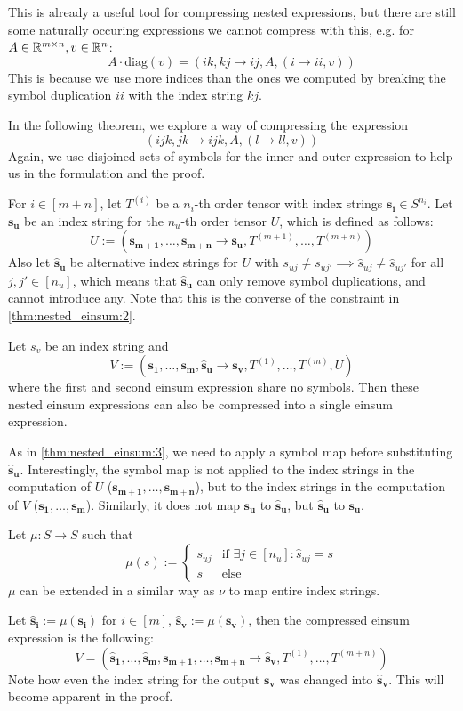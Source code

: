 This is already a useful tool for compressing nested expressions, but there are still some naturally occuring expressions we cannot compress with this,
e.g. for $A \in \mathbb{R}^{m \times n}, v \in \mathbb{R}^{n}$:
$$A \cdot \text{diag}(v) = (ik, kj \rightarrow ij, A, (i \rightarrow ii, v))$$
This is because we use more indices than the ones we computed by breaking the symbol duplication $ii$ with the index string $kj$.

In the following theorem, we explore a way of compressing the expression
$$(ijk, jk \rightarrow ijk, A, (l \rightarrow ll, v))$$
Again, we use disjoined sets of symbols for the inner and outer expression to help us in the formulation and the proof.

\begin{theorem}
    \label{thm:nested_einsum:3}

    For $i \in [m + n]$, let $T^{(i)}$ be a $n_i$-th order tensor with index strings $\bm{s_i} \in S^{n_i}$.
    Let $\bm{s_u}$ be an index string for the $n_u$-th order tensor $U$, which is defined as follows:
    $$U := (\bm{s_{m + 1}},\dots,\bm{s_{m + n}} \rightarrow \bm{s_u}, T^{(m + 1)},\dots,T^{(m + n)})$$
    Also let $\bm{\hat{s}_u}$ be alternative index strings for $U$ with $s_{uj} \neq s_{uj'} \implies \hat{s}_{uj} \neq \hat{s}_{uj'}$ for all $j, j' \in [n_u]$,
    which means that $\bm{\hat{s}_u}$ can only remove symbol duplications, and cannot introduce any.
    Note that this is the converse of the constraint in \autoref{thm:nested_einsum:2}.

    Let $s_v$ be an index string and
    $$V := (\bm{s_1},\dots,\bm{s_m}, \bm{\hat{s}_u} \rightarrow \bm{s_v}, T^{(1)},\dots,T^{(m)}, U)$$
    where the first and second einsum expression share no symbols.
    Then these nested einsum expressions can also be compressed into a single einsum expression.

    As in \autoref{thm:nested_einsum:3}, we need to apply a symbol map before substituting $\bm{\hat{s}_u}$.
    Interestingly, the symbol map is not applied to the index strings in the computation of $U$ ($\bm{s_{m + 1}},\dots,\bm{s_{m + n}}$),
    but to the index strings in the computation of $V$ ($\bm{s_1},\dots,\bm{s_m}$).
    Similarly, it does not map $\bm{s_u}$ to $\bm{\hat{s}_u}$, but $\bm{\hat{s}_u}$ to $\bm{s_u}$.

    Let $\mu: S \rightarrow S$ such that
    $$\mu(s) := \begin{cases}
            s_{uj} & \text{if }\exists j \in [n_u]: \hat{s}_{uj} = s \\
            s      & \text{else}
        \end{cases}$$
    $\mu$ can be extended in a similar way as $\nu$ to map entire index strings.

    Let $\bm{\hat{s}_i} := \mu(\bm{s_i})$ for $i \in [m]$, $\bm{\hat{s}_v} := \mu(\bm{s_v})$, then the compressed einsum expression is the following:
    $$V = (\bm{\hat{s}_1},\dots,\bm{\hat{s}_m}, \bm{s_{m + 1}}, \dots, \bm{s_{m + n}} \rightarrow \bm{\hat{s}_v}, T^{(1)},\dots,T^{(m + n)})$$
    Note how even the index string for the output $\bm{s_v}$ was changed into $\bm{\hat{s}_v}$.
    This will become apparent in the proof.
\end{theorem}

